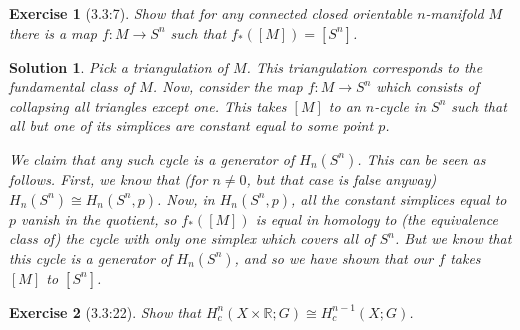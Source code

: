 \documentclass{article}
\theoremstyle{plain}
\newtheorem*{ex}{Exercise}
\theoremstyle{nonumberplain}
\newtheorem{sol}{Solution}
\newcommand{\R}{\mathbb{R}}
\begin{document}
\begin{ex}[3.3:7]
Show that for any connected closed orientable $n$-manifold $M$ there is a map $f \colon M \to S^n$ such that $f_*([M]) = [S^n]$.
\end{ex}

\begin{sol}
Pick a triangulation of $M$. This triangulation corresponds to the fundamental class of $M$. Now, consider the map $f \colon M \to S^n$ which consists of collapsing all triangles except one. This takes $[M]$ to an $n$-cycle in $S^n$ such that all but one of its simplices are constant equal to some point $p$.

We claim that any such cycle is a generator of $H_n(S^n)$. This can be seen as follows. First, we know that (for $n \neq 0$, but that case is false anyway) $H_n(S^n) \cong H_n(S^n, p)$. Now, in $H_n(S^n, p)$, all the constant simplices equal to $p$ vanish in the quotient, so $f_*([M])$ is equal in homology to (the equivalence class of) the cycle with only one simplex which covers all of $S^n$. But we know that this cycle is a generator of $H_n(S^n)$, and so we have shown that our $f$ takes $[M]$ to $[S^n]$.
\end{sol}

\begin{ex}[3.3:22]
Show that $H^n_c(X \times \R; G) \cong H^{n-1}_c(X;G)$.
\end{ex}
\end{document}

